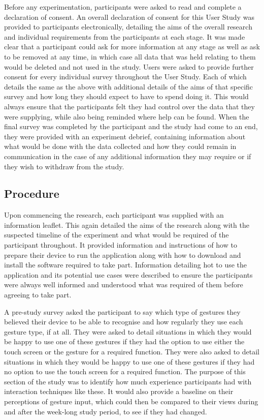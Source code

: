 \documentclass{l4proj}
\begin{document}
Before any experimentation, participants were asked to read and complete a declaration of consent. An overall declaration of consent for this User Study was provided to participants electronically, detailing the aims of the overall research and individual requirements from the participants at each stage. It was made clear that a participant could ask for more information at any stage as well as ask to be removed at any time, in which case all data that was held relating to them would be deleted and not used in the study. Users were asked to provide further consent for every individual survey throughout the User Study. Each of which details the same as the above with additional details of the aims of that specific survey and how long they should expect to have to spend doing it. This would always ensure that the participants felt they had control over the data that they were supplying, while also being reminded where help can be found. When the final survey was completed by the participant and the study had come to an end, they were provided with an experiment debrief, containing information about what would be done with the data collected and how they could remain in communication in the case of any additional information they may require or if they wish to withdraw from the study.

\subsection{Procedure}

Upon commencing the research, each participant was supplied with an information leaflet. This again detailed the aims of the research along with the suspected timeline of the experiment and what would be required of the participant throughout. It provided information and instructions of how to prepare their device to run the application along with how to download and install the software required to take part. Information detailing hot to use the application and its potential use cases were described to ensure the participants were always well informed and understood what was required of them before agreeing to take part.

A pre-study survey asked the participant to say which type of gestures they believed their device to be able to recognise and how regularly they use each gesture type, if at all. They were asked to detail situations in which they would be happy to use one of these gestures if they had the option to use either the touch screen or the gesture for a required function. They were also asked to detail situations in which they would be happy to use one of these gestures if they had no option to use the touch screen for a required function. The purpose of this section of the study was to identify how much experience participants had with interaction techniques like these. It would also provide a baseline on their perceptions of gesture input, which could then be compared to their views during and after the week-long study period, to see if they had changed.
\end{document}
